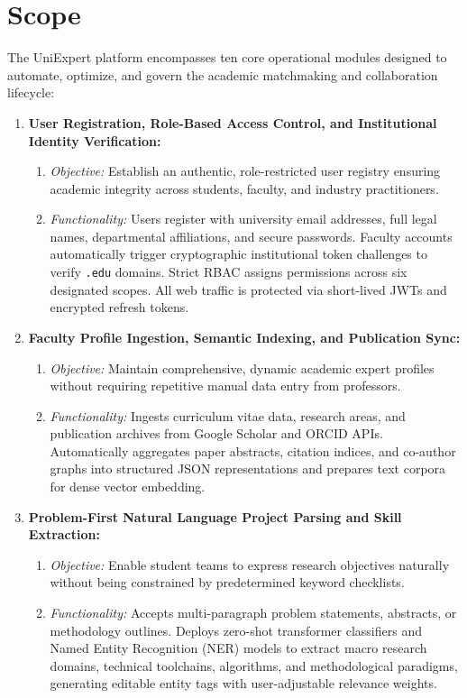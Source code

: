 \section{Scope}
\label{sec:scope}

The UniExpert platform encompasses ten core operational modules designed to automate, optimize, and govern the academic matchmaking and collaboration lifecycle:

\begin{enumerate}[label=\textbf{\arabic*.}]
    \item \textbf{User Registration, Role-Based Access Control, and Institutional Identity Verification:}
    \begin{enumerate}[label=(\alph*)]
        \item \textit{Objective:} Establish an authentic, role-restricted user registry ensuring academic integrity across students, faculty, and industry practitioners.
        \item \textit{Functionality:} Users register with university email addresses, full legal names, departmental affiliations, and secure passwords. Faculty accounts automatically trigger cryptographic institutional token challenges to verify \texttt{.edu} domains. Strict RBAC assigns permissions across six designated scopes. All web traffic is protected via short-lived JWTs and encrypted refresh tokens.
    \end{enumerate}
    
    \item \textbf{Faculty Profile Ingestion, Semantic Indexing, and Publication Sync:}
    \begin{enumerate}[label=(\alph*)]
        \item \textit{Objective:} Maintain comprehensive, dynamic academic expert profiles without requiring repetitive manual data entry from professors.
        \item \textit{Functionality:} Ingests curriculum vitae data, research areas, and publication archives from Google Scholar and ORCID APIs. Automatically aggregates paper abstracts, citation indices, and co-author graphs into structured JSON representations and prepares text corpora for dense vector embedding.
    \end{enumerate}

    \item \textbf{Problem-First Natural Language Project Parsing and Skill Extraction:}
    \begin{enumerate}[label=(\alph*)]
        \item \textit{Objective:} Enable student teams to express research objectives naturally without being constrained by predetermined keyword checklists.
        \item \textit{Functionality:} Accepts multi-paragraph problem statements, abstracts, or methodology outlines. Deploys zero-shot transformer classifiers and Named Entity Recognition (NER) models to extract macro research domains, technical toolchains, algorithms, and methodological paradigms, generating editable entity tags with user-adjustable relevance weights.
    \end{enumerate}


\end{enumerate}
